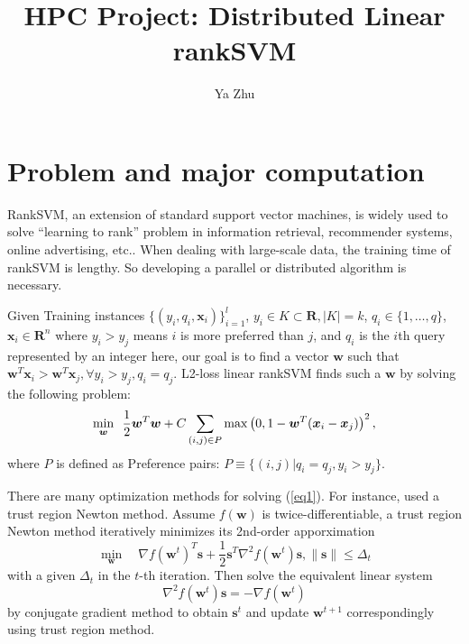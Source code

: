 \documentclass[11pt, oneside]{article}   	%
\title{\bf HPC Project: Distributed Linear rankSVM}
\author{Ya Zhu}
\def\bx{{\boldsymbol x}}
\def\bw{{\boldsymbol w}}
\def\bs{{\boldsymbol s}}
\begin{document}
\maketitle 
\section{Problem and major computation}
RankSVM, an extension of standard support vector machines, is widely used to solve ``learning to rank'' problem in information retrieval, recommender systems, online advertising, etc.. When dealing with large-scale data, the training time of rankSVM is lengthy. So developing a parallel or distributed algorithm is necessary. 

Given Training instances $\{(y_i,q_i,\bx_i)\}_{i = 1}^l$, $y_i \in K \subset \mathbf{R}, |K| = k$, $q_i \in \{1,\ldots,q\}$, $\bx_i \in \mathbf{R}^n$ where $y_i>y_j$ means $i$ is more preferred than $j$, and $q_i$ is the $i$th query represented by an integer here, our goal is to find a vector $\bw$ such that $\bw^T\bx_i > \bw^T\bx_j, \forall y_i>y_j, q_i=q_j$. L2-loss linear rankSVM finds such a $\bw$ by solving the following problem:
\begin{equation}\label{eq1}
\min_{\bw} \enskip \frac{1}{2} \bw^T\bw + C \sum_{(i,j)\in P}\max \left(0 , 1 - \bw^T (\bx_i - \bx_j) \right)^{2},
\end{equation}
where $P$ is defined as Preference pairs: $P \equiv \{(i,j)|q_i=q_j,y_i>y_j\}$.

There are many optimization methods for solving (\ref{eq1}). For instance, \citep{CPL13a} used a trust region Newton method.  Assume $f(\bw)$ is twice-differentiable, a trust region Newton method iteratively minimizes its 2nd-order apporximation
		\begin{equation*}
			\min_{\bw} \quad \nabla f(\bw^t)^T\bs + 
			\frac{1}{2} \bs^T \nabla^2 f(\bw^t) \bs,
			\|\bs\| \le \Delta_t
		\end{equation*}
		with a given $\Delta_t$ in the $t$-th iteration.
Then solve the equivalent linear system
		\begin{equation*}
			\nabla^2 f(\bw^t) \bs = -\nabla f(\bw^t)
		\end{equation*}
		by conjugate gradient method to obtain $\bs^t$ and update $\bw^{t+1}$ correspondingly using trust region method.
		
\end{document}
